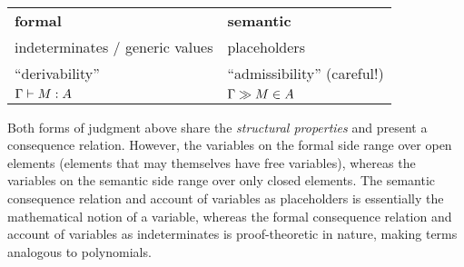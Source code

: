 \documentclass{article}
\begin{document}
\medskip
\begin{center}
  \begin{tabular}{ll}
    \textbf{formal} & \textbf{semantic}
    \\
    indeterminates / generic values & placeholders
    \\
    ``derivability'' & ``admissibility'' (careful!)
    \\
    $\hasEF{\Gamma}{M}{A}$ & $\hasEC{\Gamma}{M}{A}$
  \end{tabular}
\end{center}

Both forms of judgment above share the \emph{structural properties}
and present a consequence relation. However, the variables on the
formal side range over open elements (elements that may themselves
have free variables), whereas the variables on the semantic side range
over only closed elements. The semantic consequence relation and
account of variables as placeholders is essentially the mathematical
notion of a variable, whereas the formal consequence relation and
account of variables as indeterminates is proof-theoretic in nature,
making terms analogous to polynomials.




\nocite{HoTTBook:13}


\end{document}
